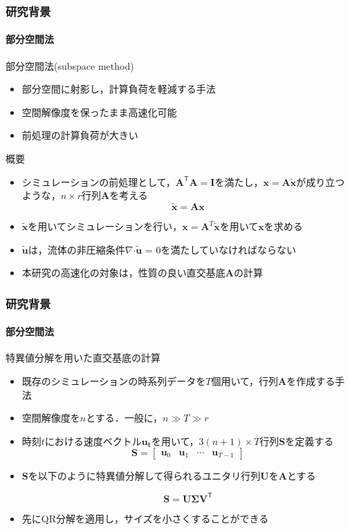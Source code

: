 \documentclass[aspectratio=169,dvipdfmx,hyperref={bookmarks=true}]{beamer}
\begin{document}
   \begin{frame}
  \frametitle{研究背景}
      \framesubtitle{部分空間法}
\begin{block}{部分空間法(subspace method)}
\begin{itemize}
\item 部分空間に射影し，計算負荷を軽減する手法
\item 空間解像度を保ったまま高速化可能
\item 前処理の計算負荷が大きい
\end{itemize}
\end{block}

\begin{block}{概要}
\begin{itemize}
 \item シミュレーションの前処理として，$\bm{A}^{\mathsf T} \bm{A} = \bm{I}$を満たし，$\bm{x} = \bm{A}\bm{\widetilde{x}} $が成り立つような，$n \times r$行列$\bm{A}$を考える
 \[
 \bm{\widetilde{x}} = \bm{A}\bm{x}
 \]
\item $\bm{\widetilde{x}}$を用いてシミュレーションを行い，$\bm{x} = \bm{A}^{T}\bm{\widetilde{x}}$を用いて$\bm{x}$を求める
\item $\bm{\widetilde{u}}$は，流体の非圧縮条件$\nabla\boldsymbol{\cdot}\bm{\widetilde{u}}$ = 0を満たしていなければならない
\item 本研究の高速化の対象は，性質の良い直交基底$\bm{A}$の計算
\end{itemize}
\end{block}
 \end{frame}
   \begin{frame}
  \frametitle{研究背景}
    \framesubtitle{部分空間法}
   \begin{block}{特異値分解を用いた直交基底の計算}
   \begin{itemize}
   \item 既存のシミュレーションの時系列データを$T$個用いて，行列$\bm{A}$を作成する手法
\item 空間解像度を$n$とする．一般に，$n \gg T \gg r$ 
\item 時刻$t$における速度ベクトル$\bm{u_t}$を用いて，$3(n+1)\times T$行列$\bm{S}$を定義する
	 \[ \bm{S} = 
        		\begin{bmatrix}
   \bm{u}_0 & \bm{u}_1 &\cdots  & \bm{u}_{T-1}
\end{bmatrix}
\]
\item $\bm{S}$を以下のように特異値分解して得られるユニタリ行列$\bm{U}$を$\bm{A}$とする

\[
\bm{S} = \bm{U} \bm{\Sigma} \bm{V}^{\mathsf T}
\]

\item 先にQR分解を適用し，サイズを小さくすることができる
\end{itemize}
\end{block}

 \end{frame}
\end{document}
